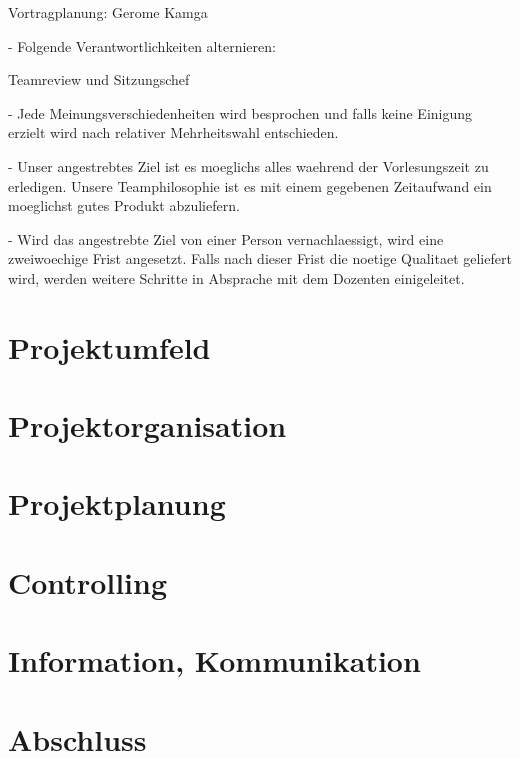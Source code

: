 \documentclass[10pt]{article}
\begin{document}
Vortragplanung: Gerome Kamga

- Folgende Verantwortlichkeiten alternieren:

Teamreview und Sitzungschef

- Jede Meinungsverschiedenheiten wird besprochen und falls keine Einigung erzielt wird nach relativer Mehrheitswahl entschieden.

- Unser angestrebtes Ziel ist es moeglichs alles waehrend der Vorlesungszeit zu erledigen. Unsere Teamphilosophie ist es mit einem gegebenen Zeitaufwand ein moeglichst gutes Produkt abzuliefern. 

- Wird das angestrebte Ziel von einer Person vernachlaessigt, wird eine zweiwoechige Frist angesetzt. Falls nach dieser Frist die noetige Qualitaet geliefert wird, werden weitere Schritte in Absprache mit dem Dozenten einigeleitet.

\section{Projektumfeld}

\section{Projektorganisation}

\section{Projektplanung}

\section{Controlling}

\section{Information, Kommunikation}

\section{Abschluss}
\end{document}
